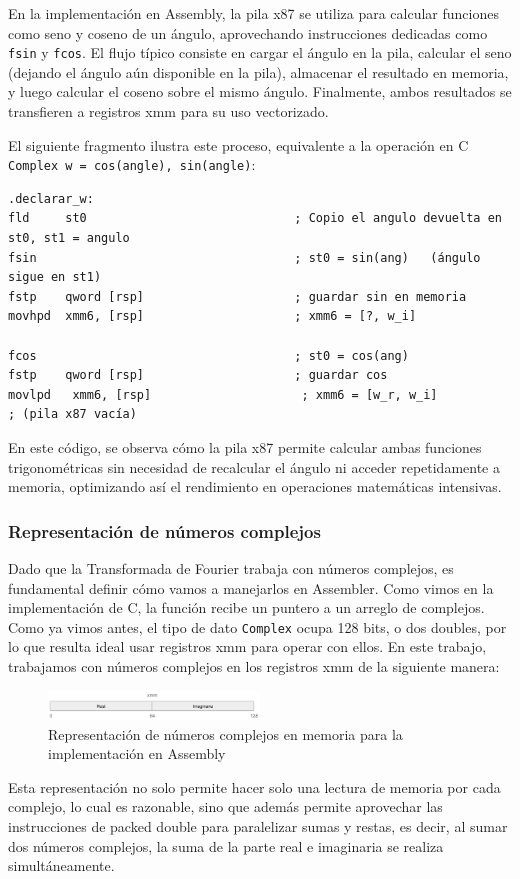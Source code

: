 \documentclass[a4paper]{article}
\begin{document}
En la implementación en Assembly, la pila x87 se utiliza para calcular funciones como seno y coseno de un ángulo, aprovechando instrucciones dedicadas como
\texttt{fsin} y \texttt{fcos}. El flujo típico consiste en cargar el ángulo en la pila, calcular el seno (dejando el ángulo aún disponible en la pila), almacenar
el resultado en memoria, y luego calcular el coseno sobre el mismo ángulo. Finalmente, ambos resultados se transfieren a registros xmm para su uso vectorizado.

El siguiente fragmento ilustra este proceso, equivalente a la operación en C \texttt{Complex w = {cos(angle), sin(angle)}}:
\begin{verbatim}
.declarar_w:
fld     st0                             ; Copio el angulo devuelta en st0, st1 = angulo
fsin                                    ; st0 = sin(ang)   (ángulo sigue en st1)
fstp    qword [rsp]                     ; guardar sin en memoria
movhpd  xmm6, [rsp]                     ; xmm6 = [?, w_i]

fcos                                    ; st0 = cos(ang)
fstp    qword [rsp]                     ; guardar cos
movlpd   xmm6, [rsp]                     ; xmm6 = [w_r, w_i]
; (pila x87 vacía)
\end{verbatim}
En este código, se observa cómo la pila x87 permite calcular ambas funciones trigonométricas sin necesidad de recalcular el ángulo ni acceder repetidamente a memoria, optimizando así el rendimiento en operaciones matemáticas intensivas.


\subsubsection{Representación de números complejos}
Dado que la Transformada de Fourier trabaja con números complejos, es fundamental definir cómo vamos a manejarlos en Assembler. Como vimos en la implementación de C, la función recibe un puntero a un arreglo de complejos. Como ya vimos antes, el tipo de dato \texttt{Complex} ocupa 128 bits, o dos doubles, por lo que resulta ideal usar registros xmm para operar con ellos. En este trabajo, trabajamos con números complejos en los registros xmm de la siguiente manera:

\begin{figure}[h]
    \centering
    \includegraphics[width=0.5\textwidth]{extra/xmm complex.png}
    \caption{Representación de números complejos en memoria para la implementación en Assembly}
    \label{fig:asm_complex_representation}
\end{figure}
Esta representación no solo permite hacer solo una lectura de memoria por cada complejo, lo cual es razonable, sino que además permite aprovechar las instrucciones de packed double para paralelizar sumas y restas, es decir, al sumar dos números complejos, la suma de la parte real e imaginaria se realiza simultáneamente.
\end{document}
